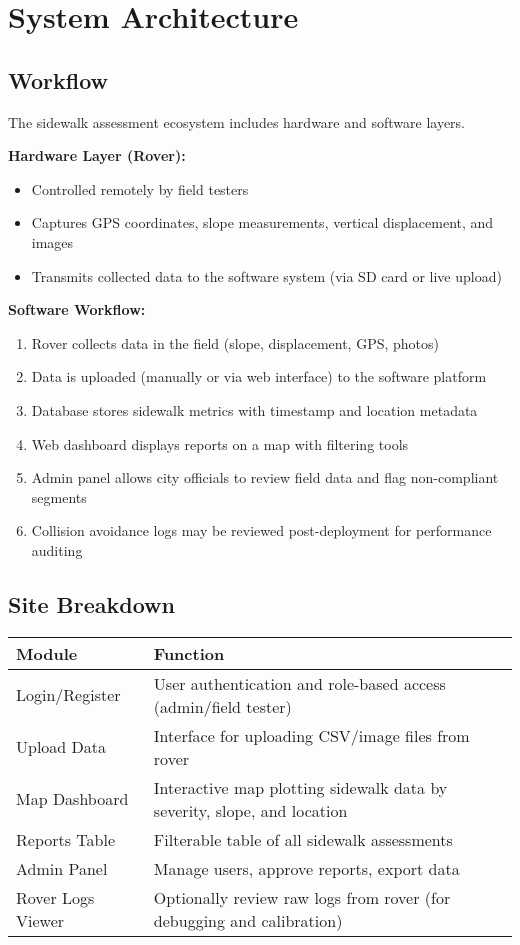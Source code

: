 \documentclass[12pt]{article}
\begin{document}
\section{System Architecture}

\subsection{Workflow}
The sidewalk assessment ecosystem includes hardware and software layers.

\textbf{Hardware Layer (Rover):}
\begin{itemize}
  \item Controlled remotely by field testers
  \item Captures GPS coordinates, slope measurements, vertical displacement, and images
  \item Transmits collected data to the software system (via SD card or live upload)
\end{itemize}

\textbf{Software Workflow:}
\begin{enumerate}
  \item Rover collects data in the field (slope, displacement, GPS, photos)
  \item Data is uploaded (manually or via web interface) to the software platform
  \item Database stores sidewalk metrics with timestamp and location metadata
  \item Web dashboard displays reports on a map with filtering tools
  \item Admin panel allows city officials to review field data and flag non-compliant segments
  \item Collision avoidance logs may be reviewed post-deployment for performance auditing
\end{enumerate}

\subsection{Site Breakdown}
\begin{longtable}{|p{4cm}|p{10cm}|}
\hline
\textbf{Module} & \textbf{Function} \\
\hline
Login/Register & User authentication and role-based access (admin/field tester) \\
\hline
Upload Data & Interface for uploading CSV/image files from rover \\
\hline
Map Dashboard & Interactive map plotting sidewalk data by severity, slope, and location \\
\hline
Reports Table & Filterable table of all sidewalk assessments \\
\hline
Admin Panel & Manage users, approve reports, export data \\
\hline
Rover Logs Viewer & Optionally review raw logs from rover (for debugging and calibration) \\
\hline
\end{longtable}
\end{document}
